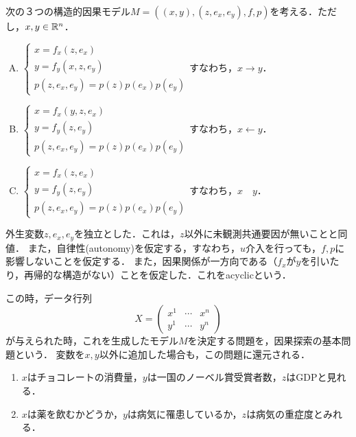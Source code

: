 \documentclass[uplatex,dvipdfmx]{jsreport}
\begin{document}
\begin{model}[因果探索の基本問題]
    次の３つの構造的因果モデル$M=((x,y),(z,e_x,e_y),f,p)$を考える．ただし，$x,y\in\mathbb{R}^n$．
    \begin{enumerate}[(A)]
        \item $\begin{cases}
            x=f_x(z,e_x)\\
            y=f_y(x,z,e_y)\\
            p(z,e_x,e_y)=p(z)p(e_x)p(e_y)
        \end{cases}$すなわち，$x\to y$．
        \item $\begin{cases}
            x=f_x(y,z,e_x)\\
            y=f_y(z,e_y)\\
            p(z,e_x,e_y)=p(z)p(e_x)p(e_y)
        \end{cases}$すなわち，$x\leftarrow y$．
        \item $\begin{cases}
            x=f_x(z,e_x)\\
            y=f_y(z,e_y)\\
            p(z,e_x,e_y)=p(z)p(e_x)p(e_y)
        \end{cases}$すなわち，$x\quad y$．
    \end{enumerate}
    外生変数$z,e_x,e_y$を独立とした．これは，$z$以外に未観測共通要因が無いことと同値．
    また，自律性(autonomy)を仮定する，すなわち，$u$介入を行っても，$f,p$に影響しないことを仮定する．
    また，因果関係が一方向である（$f_x$が$y$を引いたり，再帰的な構造がない）ことを仮定した．これをacyclicという．

    この時，データ行列
    \[X=\begin{pmatrix}x^1&\cdots&x^n\\y^1&\cdots&y^n\end{pmatrix}\]
    が与えられた時，これを生成したモデル$M$を決定する問題を，因果探索の基本問題という．
    変数を$x,y$以外に追加した場合も，この問題に還元される．
\end{model}
\begin{example}\mbox{}
    \begin{enumerate}
        \item $x$はチョコレートの消費量，$y$は一国のノーベル賞受賞者数，$z$はGDPと見れる．
        \item $x$は薬を飲むかどうか，$y$は病気に罹患しているか，$z$は病気の重症度とみれる．
    \end{enumerate}
\end{example}
\end{document}
